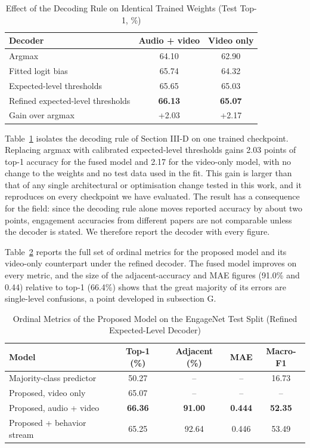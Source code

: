 \documentclass[journal]{IEEEtran}
\begin{document}
\begin{table}[!t]
\renewcommand{\arraystretch}{1.3}
\caption{Effect of the Decoding Rule on Identical Trained Weights (Test Top-1, \%)}
\label{tab_decoder}
\centering
\begin{tabular}{|l|c|c|}
\hline
Decoder & Audio + video & Video only\\
\hline
Argmax & 64.10 & 62.90\\
Fitted logit bias & 65.74 & 64.32\\
Expected-level thresholds & 65.65 & 65.03\\
Refined expected-level thresholds & \textbf{66.13} & \textbf{65.07}\\
\hline
Gain over argmax & +2.03 & +2.17\\
\hline
\end{tabular}
\end{table}

Table~\ref{tab_decoder} isolates the decoding rule of Section III-D on one trained checkpoint. Replacing argmax with calibrated expected-level thresholds gains 2.03 points of top-1 accuracy for the fused model and 2.17 for the video-only model, with no change to the weights and no test data used in the fit. This gain is larger than that of any single architectural or optimisation change tested in this work, and it reproduces on every checkpoint we have evaluated. The result has a consequence for the field: since the decoding rule alone moves reported accuracy by about two points, engagement accuracies from different papers are not comparable unless the decoder is stated. We therefore report the decoder with every figure.

Table~\ref{tab_ordinal} reports the full set of ordinal metrics for the proposed model and its video-only counterpart under the refined decoder. The fused model improves on every metric, and the size of the adjacent-accuracy and MAE figures (91.0\% and 0.44) relative to top-1 (66.4\%) shows that the great majority of its errors are single-level confusions, a point developed in subsection G.

\begin{table}[!t]
\renewcommand{\arraystretch}{1.3}
\caption{Ordinal Metrics of the Proposed Model on the EngageNet Test Split (Refined Expected-Level Decoder)}
\label{tab_ordinal}
\centering
\begin{tabular}{|l|c|c|c|c|}
\hline
Model & Top-1 (\%) & Adjacent (\%) & MAE & Macro-F1\\
\hline
Majority-class predictor & 50.27 & -- & -- & 16.73\\
Proposed, video only & 65.07 & -- & -- & --\\
Proposed, audio + video & \textbf{66.36} & \textbf{91.00} & \textbf{0.444} & \textbf{52.35}\\
Proposed + behavior stream & 65.25 & 92.64 & 0.446 & 53.49\\
\hline
\end{tabular}
\end{table}
\end{document}
